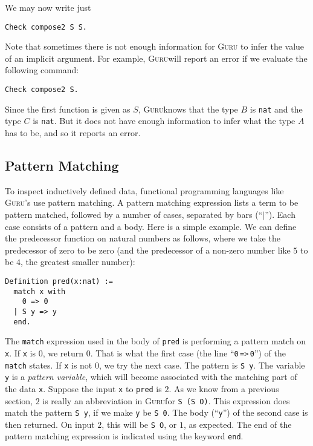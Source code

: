 \documentclass{book}[12pt]
\newcommand{\guru}[0]{\textsc{Guru}}
\begin{document}
\noindent We may now write just

\begin{verbatim}
Check compose2 S S.
\end{verbatim}

\noindent Note that sometimes there is not enough information for \guru
to infer the value of an implicit argument.  For example, \guru will report
an error if we evaluate the following command:

\begin{verbatim}
Check compose2 S.
\end{verbatim}

\noindent Since the first function is given as $S$, \guru knows that
the type $B$ is \texttt{nat} and the type $C$ is \texttt{nat}.  But
it does not have enough information to infer what the type $A$ has to
be, and so it reports an error.

\subsection{Pattern Matching}

To inspect inductively defined data, functional programming languages
like \guru's use pattern matching.  A pattern matching expression lists
a term to be pattern matched, followed by a number of cases, separated
by bars (``$|$'').  Each case consists of a pattern and a body.  Here
is a simple example.  We can define the predecessor function on
natural numbers as follows, where we take the predecessor of zero to
be zero (and the predecessor of a non-zero number like $5$ to be $4$,
the greatest smaller number):

\begin{verbatim}
Definition pred(x:nat) := 
  match x with
    0 => 0
  | S y => y
  end.
\end{verbatim}

\noindent The \texttt{match} expression used in the body of
\texttt{pred} is performing a pattern match on \texttt{x}.  If
\texttt{x} is $0$, we return $0$.  That is what the first case (the
line ``\texttt{0}\,\texttt{=>}\,\texttt{0}'') of the \texttt{match}
states.  If \texttt{x} is not $0$, we try the next case.  The pattern
is \texttt{S y}.  The variable \texttt{y} is a \emph{pattern
variable}, which will become associated with the matching part of the
data \texttt{x}.  Suppose the input \texttt{x} to \texttt{pred} is
$2$.  As we know from a previous section, $2$ is really an
abbreviation in \guru for \texttt{S\ (S\ O)}.  This expression does
match the pattern \texttt{S\ y}, if we make \texttt{y} be \texttt{S\
0}.  The body (``\texttt{y}'') of the second case is then returned.  On
input $2$, this will be \texttt{S\ O}, or $1$, as expected.  The end
of the pattern matching expression is indicated using the keyword
\texttt{end}.
\end{document}
